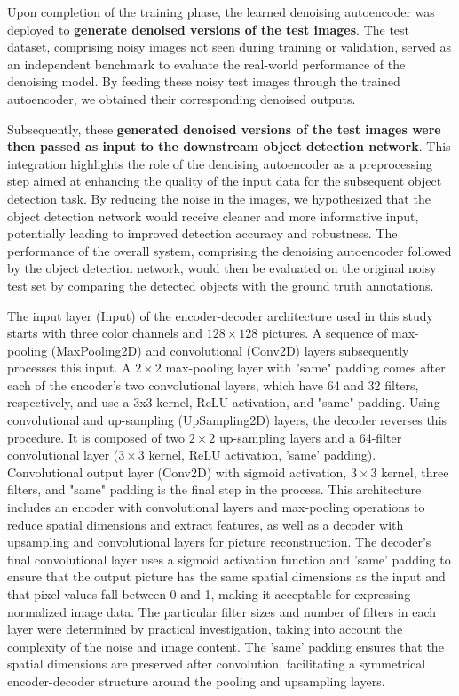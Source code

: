 \documentclass[12pt, conference]{IEEEtran}
\begin{document}
Upon completion of the training phase, the learned denoising autoencoder was deployed to \textbf{generate denoised versions of the test images}. The test dataset, comprising noisy images not seen during training or validation, served as an independent benchmark to evaluate the real-world performance of the denoising model. By feeding these noisy test images through the trained autoencoder, we obtained their corresponding denoised outputs.

Subsequently, these \textbf{generated denoised versions of the test images were then passed as input to the downstream object detection network}. This integration highlights the role of the denoising autoencoder as a preprocessing step aimed at enhancing the quality of the input data for the subsequent object detection task. By reducing the noise in the images, we hypothesized that the object detection network would receive cleaner and more informative input, potentially leading to improved detection accuracy and robustness. The performance of the overall system, comprising the denoising autoencoder followed by the object detection network, would then be evaluated on the original noisy test set by comparing the detected objects with the ground truth annotations.

The input layer (Input) of the encoder-decoder architecture used in this study starts with three color channels and $128\times128$ pictures. A sequence of max-pooling (MaxPooling2D) and convolutional (Conv2D) layers subsequently processes this input. A $2\times2$ max-pooling layer with "same" padding comes after each of the encoder's two convolutional layers, which have 64 and 32 filters, respectively, and use a 3x3 kernel, ReLU activation, and "same" padding. Using convolutional and up-sampling (UpSampling2D) layers, the decoder reverses this procedure. It is composed of two $2\times2$ up-sampling layers and a 64-filter convolutional layer ($3\times3$ kernel, ReLU activation, 'same' padding). Convolutional output layer (Conv2D) with sigmoid activation, $3\times3$ kernel, three filters, and "same" padding is the final step in the process.
\newline
\newline
This architecture includes an encoder with convolutional layers and max-pooling operations to reduce spatial dimensions and extract features, as well as a decoder with upsampling and convolutional layers for picture reconstruction. The decoder's final convolutional layer uses a sigmoid activation function and 'same' padding to ensure that the output picture has the same spatial dimensions as the input and that pixel values fall between 0 and 1, making it acceptable for expressing normalized image data. The particular filter sizes and number of filters in each layer were determined by practical investigation, taking into account the complexity of the noise and image content. The 'same' padding ensures that the spatial dimensions are preserved after convolution, facilitating a symmetrical encoder-decoder structure around the pooling and upsampling layers.
\end{document}
